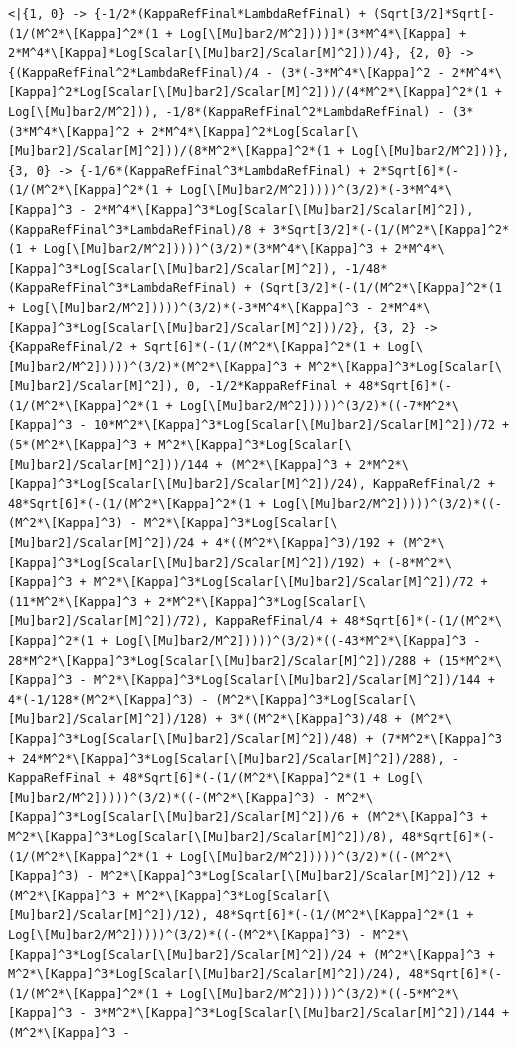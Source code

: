 \documentclass[11pt]{article}
\begin{document}
\begin{verbatim}
<|{1, 0} -> {-1/2*(KappaRefFinal*LambdaRefFinal) + (Sqrt[3/2]*Sqrt[-(1/(M^2*\[Kappa]^2*(1 + Log[\[Mu]bar2/M^2])))]*(3*M^4*\[Kappa] + 2*M^4*\[Kappa]*Log[Scalar[\[Mu]bar2]/Scalar[M]^2]))/4}, {2, 0} -> {(KappaRefFinal^2*LambdaRefFinal)/4 - (3*(-3*M^4*\[Kappa]^2 - 2*M^4*\[Kappa]^2*Log[Scalar[\[Mu]bar2]/Scalar[M]^2]))/(4*M^2*\[Kappa]^2*(1 + Log[\[Mu]bar2/M^2])), -1/8*(KappaRefFinal^2*LambdaRefFinal) - (3*(3*M^4*\[Kappa]^2 + 2*M^4*\[Kappa]^2*Log[Scalar[\[Mu]bar2]/Scalar[M]^2]))/(8*M^2*\[Kappa]^2*(1 + Log[\[Mu]bar2/M^2]))}, {3, 0} -> {-1/6*(KappaRefFinal^3*LambdaRefFinal) + 2*Sqrt[6]*(-(1/(M^2*\[Kappa]^2*(1 + Log[\[Mu]bar2/M^2]))))^(3/2)*(-3*M^4*\[Kappa]^3 - 2*M^4*\[Kappa]^3*Log[Scalar[\[Mu]bar2]/Scalar[M]^2]), (KappaRefFinal^3*LambdaRefFinal)/8 + 3*Sqrt[3/2]*(-(1/(M^2*\[Kappa]^2*(1 + Log[\[Mu]bar2/M^2]))))^(3/2)*(3*M^4*\[Kappa]^3 + 2*M^4*\[Kappa]^3*Log[Scalar[\[Mu]bar2]/Scalar[M]^2]), -1/48*(KappaRefFinal^3*LambdaRefFinal) + (Sqrt[3/2]*(-(1/(M^2*\[Kappa]^2*(1 + Log[\[Mu]bar2/M^2]))))^(3/2)*(-3*M^4*\[Kappa]^3 - 2*M^4*\[Kappa]^3*Log[Scalar[\[Mu]bar2]/Scalar[M]^2]))/2}, {3, 2} -> {KappaRefFinal/2 + Sqrt[6]*(-(1/(M^2*\[Kappa]^2*(1 + Log[\[Mu]bar2/M^2]))))^(3/2)*(M^2*\[Kappa]^3 + M^2*\[Kappa]^3*Log[Scalar[\[Mu]bar2]/Scalar[M]^2]), 0, -1/2*KappaRefFinal + 48*Sqrt[6]*(-(1/(M^2*\[Kappa]^2*(1 + Log[\[Mu]bar2/M^2]))))^(3/2)*((-7*M^2*\[Kappa]^3 - 10*M^2*\[Kappa]^3*Log[Scalar[\[Mu]bar2]/Scalar[M]^2])/72 + (5*(M^2*\[Kappa]^3 + M^2*\[Kappa]^3*Log[Scalar[\[Mu]bar2]/Scalar[M]^2]))/144 + (M^2*\[Kappa]^3 + 2*M^2*\[Kappa]^3*Log[Scalar[\[Mu]bar2]/Scalar[M]^2])/24), KappaRefFinal/2 + 48*Sqrt[6]*(-(1/(M^2*\[Kappa]^2*(1 + Log[\[Mu]bar2/M^2]))))^(3/2)*((-(M^2*\[Kappa]^3) - M^2*\[Kappa]^3*Log[Scalar[\[Mu]bar2]/Scalar[M]^2])/24 + 4*((M^2*\[Kappa]^3)/192 + (M^2*\[Kappa]^3*Log[Scalar[\[Mu]bar2]/Scalar[M]^2])/192) + (-8*M^2*\[Kappa]^3 + M^2*\[Kappa]^3*Log[Scalar[\[Mu]bar2]/Scalar[M]^2])/72 + (11*M^2*\[Kappa]^3 + 2*M^2*\[Kappa]^3*Log[Scalar[\[Mu]bar2]/Scalar[M]^2])/72), KappaRefFinal/4 + 48*Sqrt[6]*(-(1/(M^2*\[Kappa]^2*(1 + Log[\[Mu]bar2/M^2]))))^(3/2)*((-43*M^2*\[Kappa]^3 - 28*M^2*\[Kappa]^3*Log[Scalar[\[Mu]bar2]/Scalar[M]^2])/288 + (15*M^2*\[Kappa]^3 - M^2*\[Kappa]^3*Log[Scalar[\[Mu]bar2]/Scalar[M]^2])/144 + 4*(-1/128*(M^2*\[Kappa]^3) - (M^2*\[Kappa]^3*Log[Scalar[\[Mu]bar2]/Scalar[M]^2])/128) + 3*((M^2*\[Kappa]^3)/48 + (M^2*\[Kappa]^3*Log[Scalar[\[Mu]bar2]/Scalar[M]^2])/48) + (7*M^2*\[Kappa]^3 + 24*M^2*\[Kappa]^3*Log[Scalar[\[Mu]bar2]/Scalar[M]^2])/288), -KappaRefFinal + 48*Sqrt[6]*(-(1/(M^2*\[Kappa]^2*(1 + Log[\[Mu]bar2/M^2]))))^(3/2)*((-(M^2*\[Kappa]^3) - M^2*\[Kappa]^3*Log[Scalar[\[Mu]bar2]/Scalar[M]^2])/6 + (M^2*\[Kappa]^3 + M^2*\[Kappa]^3*Log[Scalar[\[Mu]bar2]/Scalar[M]^2])/8), 48*Sqrt[6]*(-(1/(M^2*\[Kappa]^2*(1 + Log[\[Mu]bar2/M^2]))))^(3/2)*((-(M^2*\[Kappa]^3) - M^2*\[Kappa]^3*Log[Scalar[\[Mu]bar2]/Scalar[M]^2])/12 + (M^2*\[Kappa]^3 + M^2*\[Kappa]^3*Log[Scalar[\[Mu]bar2]/Scalar[M]^2])/12), 48*Sqrt[6]*(-(1/(M^2*\[Kappa]^2*(1 + Log[\[Mu]bar2/M^2]))))^(3/2)*((-(M^2*\[Kappa]^3) - M^2*\[Kappa]^3*Log[Scalar[\[Mu]bar2]/Scalar[M]^2])/24 + (M^2*\[Kappa]^3 + M^2*\[Kappa]^3*Log[Scalar[\[Mu]bar2]/Scalar[M]^2])/24), 48*Sqrt[6]*(-(1/(M^2*\[Kappa]^2*(1 + Log[\[Mu]bar2/M^2]))))^(3/2)*((-5*M^2*\[Kappa]^3 - 3*M^2*\[Kappa]^3*Log[Scalar[\[Mu]bar2]/Scalar[M]^2])/144 + (M^2*\[Kappa]^3 - 
\end{verbatim}
\end{document}
